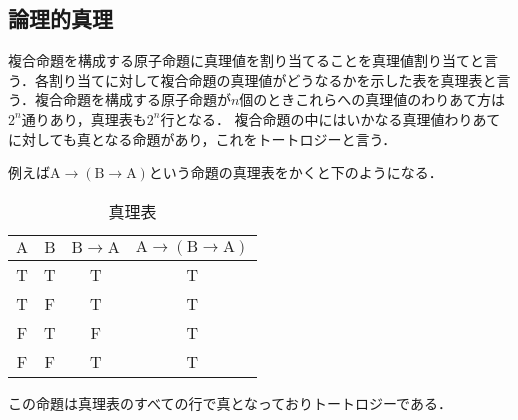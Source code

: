 \documentclass[10pt,b5paper,papersize,dvipdfmx]{jsbook}
\newcommand\rmA{\mathrm{A}}
\newcommand\rmB{\mathrm{B}}
\begin{document}
\subsection{論理的真理}
複合命題を構成する原子命題に真理値を割り当てることを真理値割り当てと言う．各割り当てに対して複合命題の真理値がどうなるかを示した表を真理表と言う．複合命題を構成する原子命題が$n$個のときこれらへの真理値のわりあて方は$2^n$通りあり，真理表も$2^n$行となる．
複合命題の中にはいかなる真理値わりあてに対しても真となる命題があり，これをトートロジーと言う．\par
例えば$\rmA \to (\rmB \to \rmA)$という命題の真理表をかくと下のようになる．
\begin{table}[H]
  \centering
  \caption{真理表}
  \begin{tabular}{cc|cc}\hline
    $\rmA$ & $\rmB$ & $\rmB \to \rmA$ &$\rmA \to (\rmB \to \rmA)$ \\ \hline
    T & T & T & T \\
    T & F & T & T \\
    F & T & F & T \\
    F & F & T & T \\ \hline
  \end{tabular}
\end{table}
この命題は真理表のすべての行で真となっておりトートロジーである．
\end{document}
